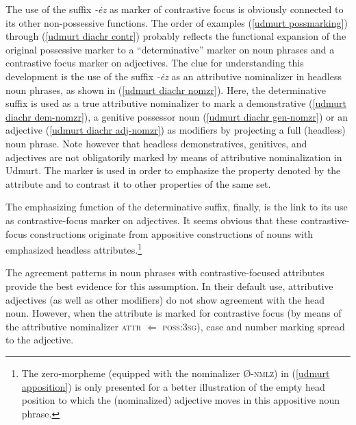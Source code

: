 The use of the suffix \textit{-ėz} as marker of contrastive focus is obviously connected to its other non-possessive functions. The order of examples (\ref{udmurt possmarking}) through (\ref{udmurt diachr contr}) probably reflects the functional expansion of the original possessive marker to a “determinative” marker on noun phrases and a contrastive focus marker on adjectives. The clue for understanding this development is the use of the suffix \textit{-ėz} as an attributive nominalizer in headless noun phrases, as shown in (\ref{udmurt diachr nomzr}). Here, the determinative suffix is used as a true attributive nominalizer to mark a demonstrative (\ref{udmurt diachr dem-nomzr}), a genitive possessor noun (\ref{udmurt diachr gen-nomzr}) or an adjective (\ref{udmurt diachr adj-nomzr}) as modifiers by projecting a full (headless) noun phrase. Note however that headless demonstratives, genitives, and adjectives are not obligatorily marked by means of attributive nominalization in Udmurt. The marker is used in order to emphasize the property denoted by the attribute and to contrast it to other properties of the same set.

The emphasizing function of the determinative suffix, finally, is the link to its use as contrastive-focus marker on adjectives. It seems obvious that these contrastive-focus constructions originate from appositive constructions of nouns with emphasized headless attributes.\footnote{The zero-morpheme (equipped with the nominalizer Ø-\textsc{nmlz}) in (\ref{udmurt apposition}) is only presented for a better illustration of the empty head position to which the (nominalized) adjective moves in this appositive noun phrase.}

The agreement patterns in noun phrases with contrastive-focused attributes provide the best evidence for this assumption. In their default use, attributive adjectives (as well as other modifiers) do not show agreement with the head noun. However, when the attribute is marked for contrastive focus (by means of the attributive nominalizer \textsc{attr} $\Leftarrow$ \textsc{poss:3sg}), case and number marking spread to the adjective.

